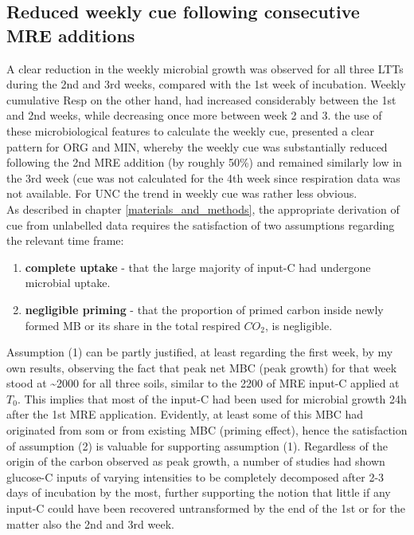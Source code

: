 	\subsection{Reduced weekly \gls{cue} following consecutive MRE additions}

	A clear reduction in the weekly microbial growth was observed for all three LTTs during the 2nd and 3rd weeks, compared with the 1st week of incubation.
	Weekly cumulative Resp on the other hand, had increased considerably between the 1st and 2nd weeks, while decreasing once more between week 2 and 3.
	the use of these microbiological features to calculate the weekly \gls{cue}, presented a clear pattern for ORG and MIN, whereby the weekly \gls{cue} was substantially reduced following the 2nd MRE addition (by roughly 50\%) and remained similarly low in the 3rd week (\gls{cue} was not calculated for the 4th week since respiration data was not available. For UNC the trend in weekly \gls{cue} was rather less obvious.\\
	As described in chapter \ref{materials_and_methods},  the appropriate derivation of \gls{cue} from unlabelled data requires the satisfaction of two assumptions regarding the relevant time frame:
	\begin{enumerate}
		\item \label{item: complete_uptake}\textbf{complete uptake} - that the large majority of input-C had undergone microbial uptake.
		\item \label{item: negligible_priming}\textbf{negligible priming} - that the proportion of primed carbon inside newly formed MB or its share in the total respired $ CO_2 $, is negligible.
	\end{enumerate}
	Assumption (1) can be partly justified, at least regarding the first week, by  my own results,  observing the fact that peak net MBC (peak growth) for that week stood at \~{}2000 \genericunit for all three soils, similar to the 2200 \genericunit of MRE input-C applied at $ T_0 $. This implies that most of the  input-C had been used for microbial growth 24h after the 1st MRE application. Evidently, at least some of this MBC had originated from \gls{som} or from existing MBC (priming effect), hence the satisfaction of assumption (2) is valuable for supporting assumption (1). Regardless of the origin of the carbon observed as peak growth, a  number of studies had shown glucose-C inputs of varying intensities to be completely decomposed after 2-3 days of incubation by the most\citep{hill2008, landi2006}, further supporting the notion that little if any input-C could have been recovered untransformed by the end of the 1st or for the matter also the 2nd and 3rd week.
